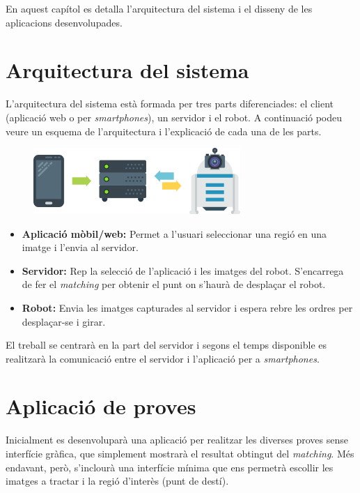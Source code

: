 \label{sec:Disseny}

En aquest capítol es detalla l'arquitectura del sistema i el disseny de les aplicacions desenvolupades.
\section{Arquitectura del sistema}
	L'arquitectura del sistema està formada per tres parts diferenciades: el client (aplicació web o per \textit{smartphones}), un servidor i el robot. A continuació podeu veure un esquema de l'arquitectura i l'explicació
	de cada una de les parts.\\
	\begin{figure}[H]
		\centering
		\includegraphics[width=0.7\textwidth]{images/arquitectura}
	\end{figure}
	\vspace{0.05cm}
	\begin{itemize}
		\item{\textbf{Aplicació mòbil/web:} Permet a l'usuari seleccionar una regió en una imatge i l'envia al servidor.}
		\item{\textbf{Servidor:} Rep la selecció de l'aplicació i les imatges del robot. S'encarrega de fer el \textit{matching} per obtenir el punt on s'haurà de desplaçar el robot.}
		\item{\textbf{Robot:} Envia les imatges capturades al servidor i espera rebre les ordres per desplaçar-se i girar.\\}
	\end{itemize}
	El treball se centrarà en la part del servidor i segons el temps disponible es realitzarà la comunicació entre el servidor i l'aplicació per a \textit{smartphones}.

\section{Aplicació de proves}
	Inicialment es desenvoluparà una aplicació per realitzar les diverses proves sense interfície gràfica, que simplement mostrarà el resultat obtingut del \textit{matching}. Més endavant, però, s'inclourà una
	interfície mínima que ens permetrà escollir les imatges a tractar i la regió d'interès (punt de destí).
